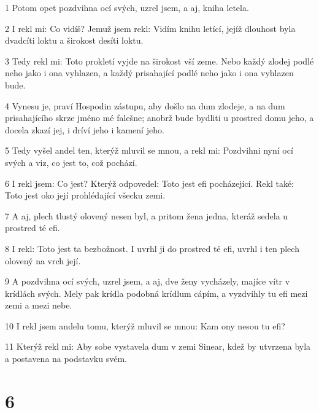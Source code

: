 \par 1 Potom opet pozdvihna ocí svých, uzrel jsem, a aj, kniha letela.
\par 2 I rekl mi: Co vidíš? Jemuž jsem rekl: Vidím knihu letící, jejíž dlouhost byla dvadcíti loktu a širokost desíti loktu.
\par 3 Tedy rekl mi: Toto prokletí vyjde na širokost vší zeme. Nebo každý zlodej podlé neho jako i ona vyhlazen, a každý prisahající podlé neho jako i ona vyhlazen bude.
\par 4 Vynesu je, praví Hospodin zástupu, aby došlo na dum zlodeje, a na dum prisahajícího skrze jméno mé falešne; anobrž bude bydliti u prostred domu jeho, a docela zkazí jej, i dríví jeho i kamení jeho.
\par 5 Tedy vyšel andel ten, kterýž mluvil se mnou, a rekl mi: Pozdvihni nyní ocí svých a viz, co jest to, což pochází.
\par 6 I rekl jsem: Co jest? Kterýž odpovedel: Toto jest efi pocházející. Rekl také: Toto jest oko její prohlédající všecku zemi.
\par 7 A aj, plech tlustý olovený nesen byl, a pritom žena jedna, kteráž sedela u prostred té efi.
\par 8 I rekl: Toto jest ta bezbožnost. I uvrhl ji do prostred té efi, uvrhl i ten plech olovený na vrch její.
\par 9 A pozdvihna ocí svých, uzrel jsem, a aj, dve ženy vycházely, majíce vítr v krídlách svých. Mely pak krídla podobná krídlum cápím, a vyzdvihly tu efi mezi zemi a mezi nebe.
\par 10 I rekl jsem andelu tomu, kterýž mluvil se mnou: Kam ony nesou tu efi?
\par 11 Kterýž rekl mi: Aby sobe vystavela dum v zemi Sinear, kdež by utvrzena byla a postavena na podstavku svém.

\chapter{6}

